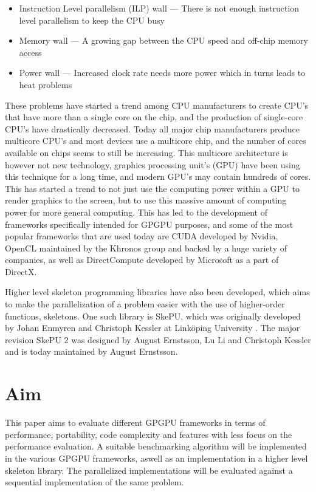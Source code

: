 \begin{itemize}
    \item Instruction Level parallelism (ILP) wall --- There is not enough instruction level parallelism to keep the CPU busy
    \item Memory wall --- A growing gap between the CPU speed and off-chip memory access
    \item Power wall --- Increased clock rate needs more power which in turns leads to heat problems
\end{itemize}

These problems have started a trend among CPU manufacturers to create CPU's that have more than a single core on the chip, and the production of single-core CPU's have drastically decreased. Today all major chip manufacturers produce multicore CPU's and most devices use a multicore chip, and the number of cores available on chips seems to still be increasing. This multicore architecture is however not new technology, graphics processing unit's (GPU) have been using this technique for a long time, and modern GPU's may contain hundreds of cores. This has started a trend to not just use the computing power within a GPU to render graphics to the screen, but to use this massive amount of computing power for more general computing. This has led to the development of frameworks specifically intended for GPGPU purposes, and some of the most popular frameworks that are used today are CUDA developed by Nvidia, OpenCL maintained by the Khronos group and backed by a huge variety of companies, as well as DirectCompute developed by Microsoft as a part of DirectX. 

Higher level skeleton programming libraries have also been developed, which aims to make the parallelization of a problem easier with the use of higher-order functions, skeletons. One such library is SkePU, which was originally developed by Johan Enmyren and Christoph Kessler at Linköping University \cite{enmyren2010skepu}. The major revision SkePU 2 was designed by August Ernstsson, Lu Li and Christoph Kessler and is today maintained by August Ernstsson.


\section{Aim} %

This paper aims to evaluate different GPGPU frameworks in terms of performance, portability, code complexity and features with less focus on the performance evaluation. A suitable benchmarking algorithm will be implemented in the various GPGPU frameworks, aswell as an implementation in a higher level skeleton library. The parallelized implementations will be evaluated against a sequential implementation of the same problem.


